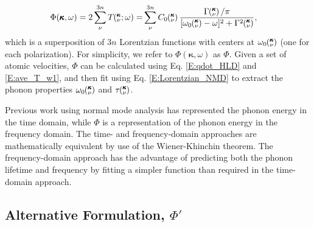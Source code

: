 \documentclass[aps,prb,preprint,superscriptaddress,amsmath,amssymb,floatfix]{revtex4}
\newcommand{\kvw}{\mspace{-4.0mu}\left(\mspace{-8.0mu}\begin{smallmatrix}&\pmb{\kappa} \\&\nu\end{smallmatrix}\mspace{-2.0mu};\omega\right)}
\newcommand{\kv}{\mspace{-4.0mu}\left(\mspace{-8.0mu}\begin{smallmatrix}&\pmb{\kappa} \\&\nu\end{smallmatrix}\mspace{-3.0mu}\right)}
\begin{document}
\begin{equation}\label{E:Lorentzian_NMD}
\begin{split}
\Phi(\pmb{\kappa},\omega) = 2\sum_{\nu}^{3n} T\kvw =& \sum_{\nu}^{3n}C_0\kv\frac{\Gamma\kv/\pi}{[\omega_0\kv-\omega]^2+\Gamma^2\kv},
\end{split}
\end{equation}
which is a superposition of $3n$ Lorentzian functions with centers at $\omega_0\kv$ (one for each polarization). For simplicity, we refer to $\Phi(\pmb{\kappa},\omega)$ as $\Phi$. Given a set of atomic velocities, $\Phi$ can be calculated using Eq$.$ \eqref{E:qdot_HLD} and \eqref{E:ave_T_w1}, and then fit using Eq$.$ \eqref{E:Lorentzian_NMD} to extract the phonon properties $\omega_0\kv$ and $\tau\kv$.

Previous work using normal mode analysis has represented the phonon energy in the time domain,\cite{ladd1986,mcgaughey2004c,henry2008,turney2009a,goicochea2010,He2011} while $\Phi$ is a representation of the phonon energy in the frequency domain. The time- and frequency-domain approaches are mathematically equivalent by use of the Wiener-Khinchin theorem.\cite{rudin1987,shiomi2011b} The frequency-domain approach has the advantage of predicting both the phonon lifetime and frequency by fitting a simpler function than required in the time-domain approach.

\subsection{\label{S:Subsection_Proposed_SED}Alternative Formulation, $\Phi'$}
\end{document}
